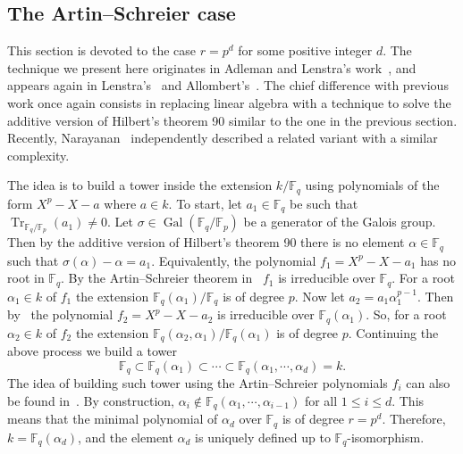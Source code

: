 \documentclass{mcom-l}
\theoremstyle{plain}
\theoremstyle{definition}
\DeclareMathOperator{\trace}{Tr} %
\DeclareMathOperator{\gal}{Gal} %
\newcommand{\F}{\ensuremath{\mathbb{F}}}
\begin{document}
\subsection{The Artin--Schreier case}
\label{sec:fast-artin-schreier}

This section is devoted to the case $r = p^d$ for some positive integer $d$.
The technique we present here originates in Adleman and Lenstra's work~\cite[Lemma 5]{Adleman-Lenstra},
and appears again in Lenstra's~\cite{LenstraJr91}
and Allombert's~\cite{Allombert02}.
The chief difference with previous work once again consists
in replacing linear algebra
with a technique to solve the additive version of Hilbert's theorem 90
similar to the one in the previous section.
Recently, Narayanan~\cite[Sec.~4]{narayanan2016fast} independently described
a related variant with a similar complexity.

The idea is to build a 
tower inside the extension $k/\F_q$ using polynomials of the form $X^p - X - a$ where $a \in k$.
To  start, let $a_1 \in \F_q$ be such that $\trace_{\F_q/\F_p}(a_1) \ne 0$.
Let $\sigma \in  \gal(\F_q/\F_p)$ be a generator of the Galois group.
Then by the additive version of  Hilbert's theorem 90 there is no element 
$\alpha \in \F_q$ such that $\sigma(\alpha) - \alpha = a_1$.
Equivalently, the polynomial $f_1 =  X^p - X - a_1$ has no root in $\F_q$.
By the Artin--Schreier theorem in~\cite[Ch VI]{lang} $f_1$ 
is irreducible over $\F_q$. For a root $\alpha_1 \in k$ of $f_1$ the extension $\F_q(\alpha_1) / \F_q$ is of degree $p$.
Now let $a_2 = a_1\alpha_1^{p - 1}$. Then by~\cite[Lemma 5]{Adleman-Lenstra} the polynomial $f_2 = 
X^p - X - a_2$ is irreducible over $\F_q(\alpha_1)$. So, for a root $\alpha_2 \in k$ of $f_2$ the 
extension $\F_q(\alpha_2, \alpha_1) / \F_q(\alpha_1)$ is of degree $p$. Continuing the above 
process we build a tower
\begin{equation}
	\label{equ:art-sch-tower}
	\F_q \subset \F_q(\alpha_1)  \subset \cdots \subset \F_q(\alpha_1, \cdots, \alpha_d) = k.
\end{equation}
The idea of building such tower using the Artin--Schreier polynomials $f_i$ can also be found
in~\cite{LenstraJr91, Allombert02, shoup93}. By construction, $\alpha_i \notin \F_q(\alpha_1, \cdots, 
\alpha_{i - 1})$ for all $1 \le i \le d$. This means that the minimal polynomial of $\alpha_d$ over 
$\F_q$ is of degree $r = p^d$. Therefore, $k = \F_q(\alpha_d)$, and the element $\alpha_d$ is 
uniquely defined up to $\F_q$-isomorphism.
\end{document}
